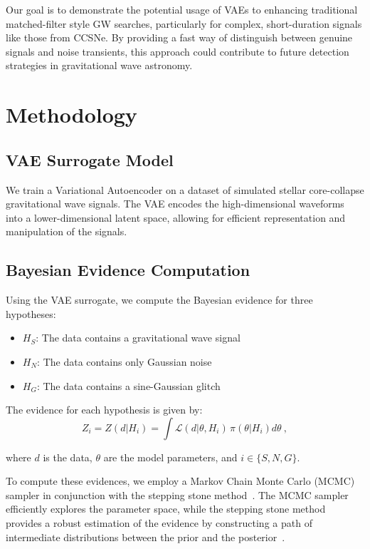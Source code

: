 \documentclass[twocolumn]{aastex631}
\begin{document}
Our goal is to demonstrate the potential usage of VAEs to enhancing traditional matched-filter style GW searches, particularly for complex, short-duration signals like those from CCSNe. 
By providing a fast way of distinguish between genuine signals and noise transients, this approach could contribute to future detection strategies in gravitational wave astronomy.


\section{Methodology}
\subsection{VAE Surrogate Model}
We train a Variational Autoencoder on a dataset of simulated stellar core-collapse gravitational wave signals. 
The VAE encodes the high-dimensional waveforms into a lower-dimensional latent space, allowing for efficient representation and manipulation of the signals.

\subsection{Bayesian Evidence Computation}
Using the VAE surrogate, we compute the Bayesian evidence for three hypotheses:
\begin{itemize}
    \item \(H_S\): The data contains a gravitational wave signal
    \item \(H_N\): The data contains only Gaussian noise
    \item \(H_G\): The data contains a sine-Gaussian glitch
\end{itemize}

The evidence for each hypothesis is given by:
\begin{equation}
    Z_i = Z(d|H_i) = \int \mathcal{L}(d|\theta, H_i)\,  \pi(\theta|H_i) d\theta\ ,
\end{equation}

where $d$ is the data, $\theta$ are the model parameters, and $i \in \{S, N, G\}$.


To compute these evidences, we employ a Markov Chain Monte Carlo (MCMC) sampler in conjunction with the stepping stone method~\cite{}. 
The MCMC sampler efficiently explores the parameter space, while the stepping stone method provides a robust estimation of the evidence by constructing a path of intermediate distributions between the prior and the posterior~\cite{}. 
\end{document}
